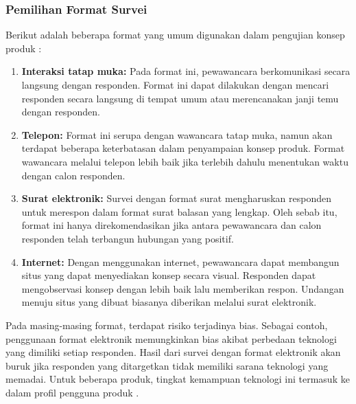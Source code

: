 \subsubsection{Pemilihan Format Survei}
Berikut adalah beberapa format yang umum digunakan dalam pengujian konsep produk \cite{bukuUlrich}:
\begin{enumerate}
    \item \textbf{Interaksi tatap muka:} Pada format ini, pewawancara berkomunikasi secara langsung dengan responden. Format ini dapat dilakukan dengan mencari responden secara langsung di tempat umum atau merencanakan janji temu dengan responden.
    \item \textbf{Telepon:} Format ini serupa dengan wawancara tatap muka, namun akan terdapat beberapa keterbatasan dalam penyampaian konsep produk. Format wawancara melalui telepon lebih baik jika terlebih dahulu menentukan waktu dengan calon responden.
    \item \textbf{Surat elektronik:} Survei dengan format surat mengharuskan responden untuk merespon dalam format surat balasan yang lengkap. Oleh sebab itu, format ini hanya direkomendasikan jika antara pewawancara dan calon responden telah terbangun hubungan yang positif.
    \item \textbf{Internet:} Dengan menggunakan internet, pewawancara dapat membangun situs yang dapat menyediakan konsep secara visual. Responden dapat mengobservasi konsep dengan lebih baik lalu memberikan respon. Undangan menuju situs yang dibuat biasanya diberikan melalui surat elektronik.
\end{enumerate}

Pada masing-masing format, terdapat risiko terjadinya bias. Sebagai contoh, penggunaan format elektronik memungkinkan bias akibat perbedaan teknologi yang dimiliki setiap responden. Hasil dari survei dengan format elektronik akan buruk jika responden yang ditargetkan tidak memiliki sarana teknologi yang memadai. Untuk beberapa produk, tingkat kemampuan teknologi ini termasuk ke dalam profil pengguna produk \cite{bukuUlrich}. \par 
